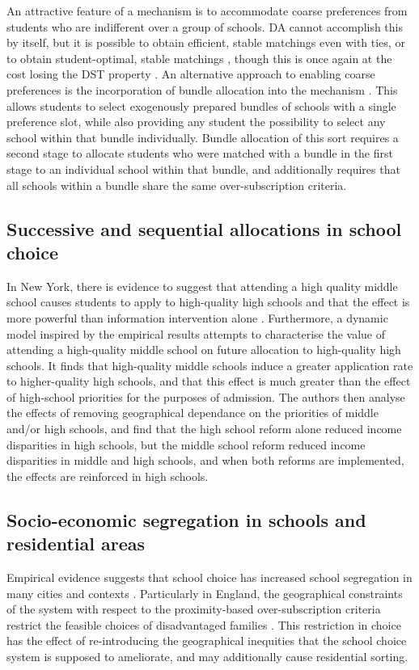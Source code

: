 \documentclass{article}
\begin{document}
\begin{multicols}{2}
An attractive feature of a mechanism is to accommodate coarse preferences from students who are indifferent over a group of schools. DA cannot accomplish this by itself, but it is possible to obtain efficient, stable matchings even with ties, or to obtain student-optimal, stable matchings \cite{erdilTwosidedMatchingIndifferences2017}, though this is once again at the cost losing the DST property \cite{rothEconomicsMatchingStability1982}. An alternative approach to enabling coarse preferences is the incorporation of bundle allocation into the mechanism \cite{huangBundledSchoolChoice2025}. This allows students to select exogenously prepared bundles of schools with a single preference slot, while also providing any student the possibility to select any school within that bundle individually. Bundle allocation of this sort requires a second stage to allocate students who were matched with a bundle in the first stage to an individual school within that bundle, and additionally requires that all schools within a bundle share the same over-subscription criteria.

\subsection{Successive and sequential allocations in school choice}
In New York, there is evidence to suggest that attending a high quality middle school causes students to apply to high-quality high schools and that the effect is more powerful than information intervention alone \cite{anderssonSequentialSchoolChoice2024}. Furthermore, a dynamic model inspired by the empirical results attempts to characterise the value of attending a high-quality middle school on future allocation to high-quality high schools. It finds that high-quality middle schools induce a greater application rate to higher-quality high schools, and that this effect is much greater than the effect of high-school priorities for the purposes of admission. The authors then analyse the effects of removing geographical dependance on the priorities of middle and/or high schools, and find that the high school reform alone reduced income disparities in high schools, but the middle school reform reduced income disparities in middle and high schools, and when both reforms are implemented, the effects are reinforced in high schools.

\subsection{Socio-economic segregation in schools and residential areas}
Empirical evidence suggests that school choice has increased school segregation in many cities and contexts \cite{wilsonSchoolChoiceCity2019}. Particularly in England, the geographical constraints of the system with respect to the proximity-based over-subscription criteria restrict the feasible choices of disadvantaged families \cite{burgessParentalChoicePrimary2011a,burgessSchoolChoiceEngland2019}. This restriction in choice has the effect of re-introducing the geographical inequities that the school choice system is supposed to ameliorate, and may additionally cause residential sorting. 


\end{multicols}
\end{document}
